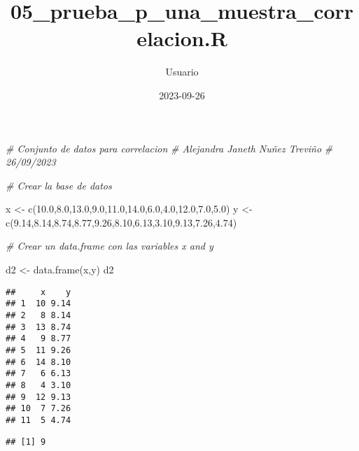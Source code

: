\documentclass[
]{article}
\title{05\_prueba\_p\_una\_muestra\_correlacion.R}
\author{Usuario}
\date{2023-09-26}
\newenvironment{Shaded}{\begin{snugshade}}{\end{snugshade}}
\newcommand{\CommentTok}[1]{\textcolor[rgb]{0.56,0.35,0.01}{\textit{#1}}}
\newcommand{\FloatTok}[1]{\textcolor[rgb]{0.00,0.00,0.81}{#1}}
\newcommand{\FunctionTok}[1]{\textcolor[rgb]{0.00,0.00,0.00}{#1}}
\newcommand{\NormalTok}[1]{#1}
\newcommand{\OtherTok}[1]{\textcolor[rgb]{0.56,0.35,0.01}{#1}}
\newcommand{\SpecialCharTok}[1]{\textcolor[rgb]{0.00,0.00,0.00}{#1}}
\begin{document}
\maketitle

\begin{Shaded}
\begin{Highlighting}[]
\CommentTok{\# Conjunto de datos para correlacion}
\CommentTok{\# Alejandra Janeth Nuñez Treviño}
\CommentTok{\# 26/09/2023}

\CommentTok{\# Crear la base de datos}

\NormalTok{x }\OtherTok{\textless{}{-}} \FunctionTok{c}\NormalTok{(}\FloatTok{10.0}\NormalTok{,}\FloatTok{8.0}\NormalTok{,}\FloatTok{13.0}\NormalTok{,}\FloatTok{9.0}\NormalTok{,}\FloatTok{11.0}\NormalTok{,}\FloatTok{14.0}\NormalTok{,}\FloatTok{6.0}\NormalTok{,}\FloatTok{4.0}\NormalTok{,}\FloatTok{12.0}\NormalTok{,}\FloatTok{7.0}\NormalTok{,}\FloatTok{5.0}\NormalTok{)}
\NormalTok{y }\OtherTok{\textless{}{-}} \FunctionTok{c}\NormalTok{(}\FloatTok{9.14}\NormalTok{,}\FloatTok{8.14}\NormalTok{,}\FloatTok{8.74}\NormalTok{,}\FloatTok{8.77}\NormalTok{,}\FloatTok{9.26}\NormalTok{,}\FloatTok{8.10}\NormalTok{,}\FloatTok{6.13}\NormalTok{,}\FloatTok{3.10}\NormalTok{,}\FloatTok{9.13}\NormalTok{,}\FloatTok{7.26}\NormalTok{,}\FloatTok{4.74}\NormalTok{)}

\CommentTok{\# Crear un data.frame con las variables x and y}

\NormalTok{d2 }\OtherTok{\textless{}{-}} \FunctionTok{data.frame}\NormalTok{(x,y)}
\NormalTok{d2 }
\end{Highlighting}
\end{Shaded}

\begin{verbatim}
##     x    y
## 1  10 9.14
## 2   8 8.14
## 3  13 8.74
## 4   9 8.77
## 5  11 9.26
## 6  14 8.10
## 7   6 6.13
## 8   4 3.10
## 9  12 9.13
## 10  7 7.26
## 11  5 4.74
\end{verbatim}

\begin{Shaded}
\end{Shaded}

\begin{verbatim}
## [1] 9
\end{verbatim}
\end{document}
